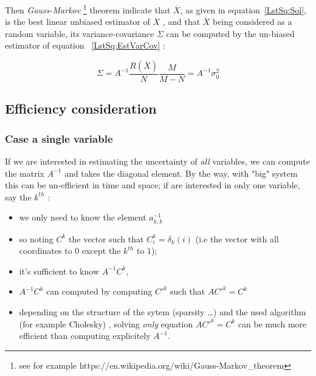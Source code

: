 Then \emph{Gauss-Markov} \footnote{see for example https://en.wikipedia.org/wiki/Gauss-Markov\_theorem}
theorem indicate that $\overline X$, as given in equation~\ref{LstSq:Sol}, is the 
best linear unbiased estimator of $X$ , and that $\overline X$ being considered as a random
variable, its variance-covariance $\Sigma$ can be computed by the un-biased estimator of
equation ~\ref{LstSq:EstVarCov} :

\begin{equation}
	\Sigma = A^{-1}  \frac{R(\overline X)}{N}  \frac{M}{M-N} = A^{-1} \sigma_0^2 \label{LstSq:EstVarCov}
\end{equation}

\subsection{Efficiency consideration}

\subsubsection{Case a single variable}

If we are interested in estimating the uncertainty of \emph{all} variables, we can
compute the matrix $A^{-1}$ and takes the diagonal element. By the way, with "big"
system this can be un-efficient in time and space; if are
interested in only one variable, say the $k^{th}$ :

\begin{itemize}
    \item  we only need to know the element $a^{-1}_{k,k}$
    \item  so noting $C^k$ the 
	   vector such that $C^k_i =\delta_k(i)$  (i.e the vector with all coordinates to $0$
           except  the $k^{th}$ to $1$);
    \item  it's sufficient to know $A^{-1} C^k$,
    \item  $A^{-1} C^k$ can computed by computing $C'^k$ such that $A C'^k = C^k$
    \item  depending on the structure of the sytem (sparsity \dots) and the used
	    algorithm (for example Cholesky) , solving \emph{only} equation $A C'^k = C^k$
		can be much more efficient than computing explicitely $A^{-1}$.
\end{itemize}

